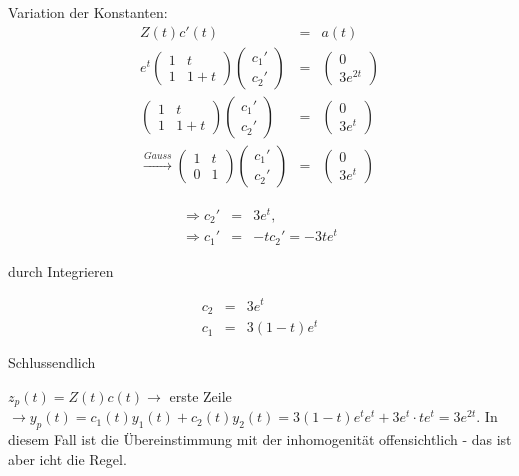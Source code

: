\documentclass[10pt,a4paper]{article}
\begin{document}
\begin{bsp}[$y''-2y'+y = 3e^{2t}$]
Variation der Konstanten:
\begin{eqnarray*}
Z(t)c'(t)&=&a(t)\\
 e^{t} \begin{pmatrix}
1 & t\\
1 & 1+t
\end{pmatrix} \begin{pmatrix}
c_1' \\ c_2'
\end{pmatrix} &=& \begin{pmatrix}
0 \\ 3e^{2t}
\end{pmatrix} \\
\begin{pmatrix}
1 & t\\
1 & 1+t
\end{pmatrix} \begin{pmatrix}
c_1' \\ c_2'
\end{pmatrix} &=& \begin{pmatrix}
0 \\ 3e^{t}
\end{pmatrix} \\
\stackrel{Gauss}{\rightarrow} \begin{pmatrix}
1 & t\\
0 & 1
\end{pmatrix} \begin{pmatrix}
c_1' \\ c_2'
\end{pmatrix} &=& \begin{pmatrix}
0 \\ 3e^{t}
\end{pmatrix}
\end{eqnarray*}


\begin{eqnarray*}
\Rightarrow c_2'& =& 3e^{t}, \\
\Rightarrow c_1' &=& -t c_2'=-3te^{t}
\end{eqnarray*}


durch Integrieren 

\begin{eqnarray*}
c_2&=&3e^{t} \\ c_1&=&3(1-t)e^{t}
\end{eqnarray*}

Schlussendlich

$z_p(t)=Z(t)c(t) \rightarrow$ erste Zeile $\rightarrow y_p(t)=c_1(t)y_1(t)+c_2(t)y_2(t)=3(1-t)e^{t}e^{t}+3e^{t} \cdot te^{t}=3e^{2t}$. In diesem Fall ist die Übereinstimmung mit der inhomogenität offensichtlich - das ist aber icht die Regel.

\end{bsp}
\end{document}
